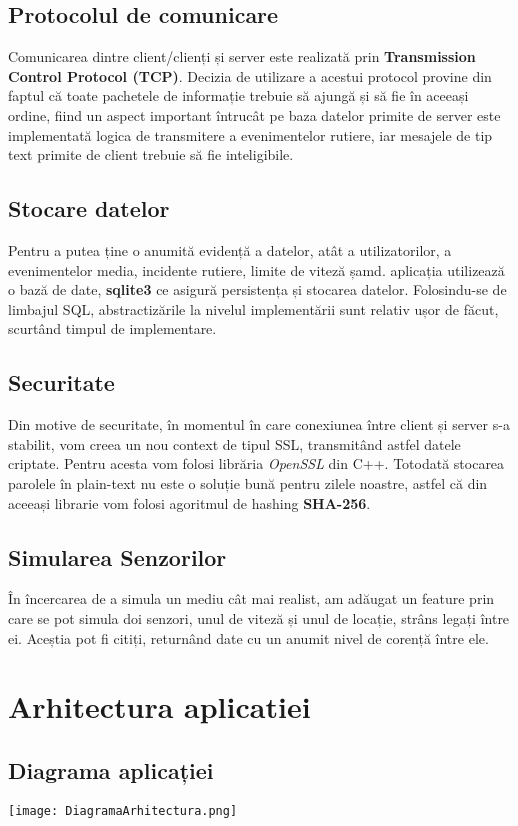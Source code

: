 \documentclass{article}
\begin{document}
\subsection{Protocolul de comunicare}
Comunicarea dintre client/clienți și server este realizată prin  \textbf{Transmission Control Protocol (TCP)}. Decizia de utilizare a acestui protocol provine din faptul că toate pachetele de informație trebuie să ajungă și să fie în aceeași ordine, fiind un aspect important întrucât pe baza datelor primite de server este implementată logica de transmitere a evenimentelor rutiere, iar  mesajele de tip text primite de client trebuie să fie inteligibile. 

\subsection{Stocare datelor}
Pentru a putea ține o anumită evidență a datelor, atât a utilizatorilor, a evenimentelor media, incidente rutiere, limite de viteză șamd. aplicația utilizează o bază de date, \textbf{sqlite3} ce asigură persistența și stocarea datelor. Folosindu-se de limbajul SQL, abstractizările la nivelul implementării sunt relativ ușor de făcut, scurtând timpul de implementare.

\subsection{Securitate}
Din motive de securitate, în momentul în care conexiunea între client și server s-a stabilit, vom creea un nou context de tipul SSL, transmitând astfel datele criptate. Pentru acesta vom folosi librăria \textit{OpenSSL} din C++. Totodată stocarea parolele în plain-text nu este o soluție bună pentru zilele noastre, astfel că din aceeași librarie vom folosi agoritmul de hashing \textbf{SHA-256}.

\subsection{Simularea Senzorilor}
În încercarea de a simula un mediu cât mai realist, am adăugat un feature prin care se pot simula doi senzori, unul de viteză și unul de locație, strâns legați între ei. Aceștia pot fi citiți, returnând date cu un anumit nivel de corență între ele.

\section{Arhitectura aplicatiei}
\subsection{Diagrama aplicației}
\texttt{[image: DiagramaArhitectura.png]}
\end{document}
